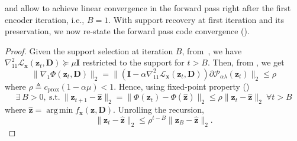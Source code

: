 \documentclass[10pt]{article} %
\newcommand{\D}{{\bm D}}
\newcommand{\eye}{{\bm I}}
\newcommand{\x}{{\bm x}}
\newcommand{\z}{{\bm z}}
\newcommand{\Loss}{\mathcal{L}}
\newcommand{\prox}{\mathcal{P}}
\DeclareMathOperator*{\argmin}{arg\,min}
\begin{document}
%
 and  allow to achieve linear convergence in the forward pass right after the first encoder iteration, i.e., $B=1$. With support recovery at first iteration and its preservation, we now re-state the forward pass code convergence ().
%
\fwdz*
\begin{proof} Given the support selection at iteration $B$, from~, we have $\nabla_{11}^2 \Loss_{\x}(\z_t, \D) \succeq \mu \eye$ restricted to the support for $t > B$. Then, from , we get
\begin{equation*}
\| \nabla_1 \Phi(\z_t, \D) \|_2 = \| (\eye - \alpha \nabla_{11}^2 \Loss_{\x}(\z_t, \D)) \partial \prox_{\alpha \lambda}(\z_t) \|_2 \leq \rho
\end{equation*}
where $\rho \triangleq  c_{\text{prox}} (1-\alpha\mu) < 1$. Hence, using fixed-point property ()
\begin{equation*}
\exists\ B > 0,\ \text{s.t.}\ \| \z_{t+1} - \hat \z \|_2 = \| \Phi(\z_t) - \Phi(\hat \z) \|_2 \leq \rho \| \z_t - \hat \z \|_2\ \forall t > B
\end{equation*}
where $\hat \z = \argmin f_{\x}(\z, \D)$. Unrolling the recursion,
\begin{equation*}
\| \z_{t} - \hat \z \|_2 \leq \rho^{t-B} \| \z_B - \hat \z \|_2.
\end{equation*}
\end{proof}
%
%
\fwdzerrorvariable*
%
\end{document}
